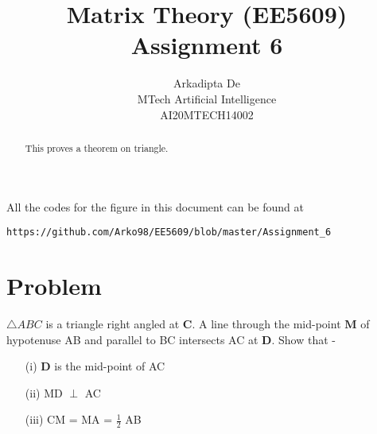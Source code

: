 \documentclass[journal,12pt,twocolumn]{IEEEtran}
\begin{document}
\makeatletter
{}
\makeatother
\let\StandardTheFigure\thefigure
\let\vec\mathbf
\renewcommand{\thefigure}{\theproblem}
\def\putbox#1#2#3{\makebox[0in][l]{\makebox[#1][l]{}\raisebox{\baselineskip}[0in][0in]{\raisebox{#2}[0in][0in]{#3}}}}
     \def\rightbox#1{\makebox[0in][r]{#1}}
     \def\centbox#1{\makebox[0in]{#1}}
     \def\topbox#1{\raisebox{-\baselineskip}[0in][0in]{#1}}
     \def\midbox#1{\raisebox{-0.5\baselineskip}[0in][0in]{#1}}
\vspace{3cm}
\title{Matrix Theory (EE5609) Assignment 6}
\author{Arkadipta De\\MTech Artificial Intelligence\\AI20MTECH14002}

\maketitle
\newpage
\bigskip
\renewcommand{\thefigure}{\theenumi}
\renewcommand{\thetable}{\theenumi}

\begin{abstract}
This proves a theorem on triangle.
\end{abstract}

All the codes for the figure in this document can be found at
\begin{lstlisting}
https://github.com/Arko98/EE5609/blob/master/Assignment_6
\end{lstlisting}

\section{Problem}
$\triangle{ABC}$ is a triangle right angled at $\vec{C}$. A line through the mid-point $\vec{M}$ of hypotenuse AB and parallel to BC intersects AC at $\vec{D}$. Show that -
\begin{itemize}
\item[(i)] $\vec{D}$ is the mid-point of AC 
\item[(ii)] MD $\perp$ AC   
\item[(iii)] CM = MA = $\frac{1}{2}$ AB
\end{itemize}
\end{document}
